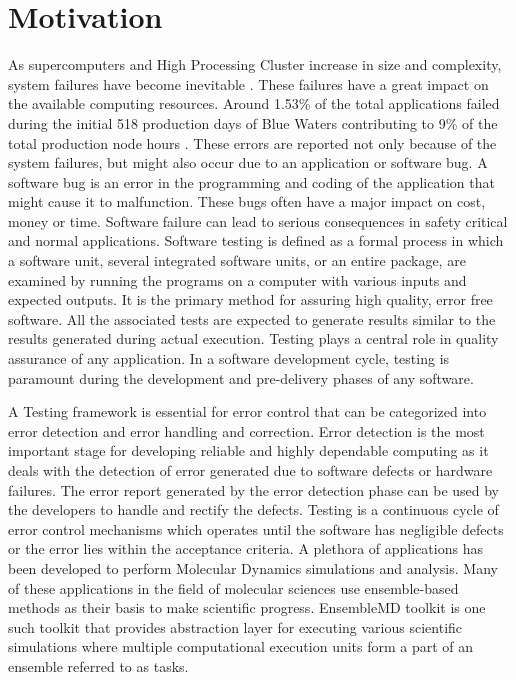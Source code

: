 \documentclass[10pt]{ruthesis}
\begin{document}
\section{Motivation}
 As supercomputers and High Processing Cluster increase in size and complexity, system failures have become inevitable \cite{ref7}. These failures have a great impact on the available computing resources. Around 1.53\% of the total applications failed during the initial 518 production days of Blue Waters contributing to 9\% of the total production node hours \cite{ref6}. These errors are reported not only because of the system failures, but might also occur due to an application or software bug. A software bug is an error in the programming and coding of the application that might cause it to malfunction. These bugs often have a major impact on cost, money or time. Software failure can lead to serious consequences in safety critical and normal applications. Software testing is defined as a formal process in which a software unit, several integrated software units, or an entire package, are examined by running the programs on a computer with various inputs and expected outputs. It is the primary method for assuring high quality, error free software.  All the associated tests are expected to generate results similar to the results generated during actual execution. Testing plays a central role in quality assurance of any application. In a software development cycle, testing is paramount during the development and pre-delivery phases of any software. 
 
 A Testing framework is essential for error control that can be categorized into error detection and error handling and correction. Error detection is the most important stage for developing reliable and highly dependable computing as it deals with the detection of error generated due to software defects or hardware failures. The error report generated by the error detection phase can be used by the developers to handle and rectify the defects. Testing is a continuous cycle of error control mechanisms which operates until the software has negligible defects or the error lies within the acceptance criteria. A plethora of applications has been developed to perform Molecular Dynamics simulations and analysis. Many of these applications in the field of molecular sciences use ensemble-based methods as their basis to make scientific progress. EnsembleMD toolkit is one such toolkit that provides abstraction layer for executing various scientific simulations where multiple computational execution units form a part of an ensemble referred to as tasks. 
\end{document}
